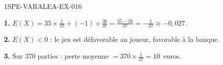 \begin{corrige}{1SPE-VARALEA-EX-016}

\textbf{1.} $E(X) = 35 \times \frac{1}{37} + (-1) \times \frac{36}{37} = \frac{35-36}{37} = -\frac{1}{37} \approx -0{,}027$.

\medskip
\textbf{2.} $E(X) < 0$ : le jeu est défavorable au joueur, favorable à la banque.

\medskip
\textbf{3.} Sur $370$ parties : perte moyenne $= 370 \times \frac{1}{37} = 10$~euros.

\end{corrige}
